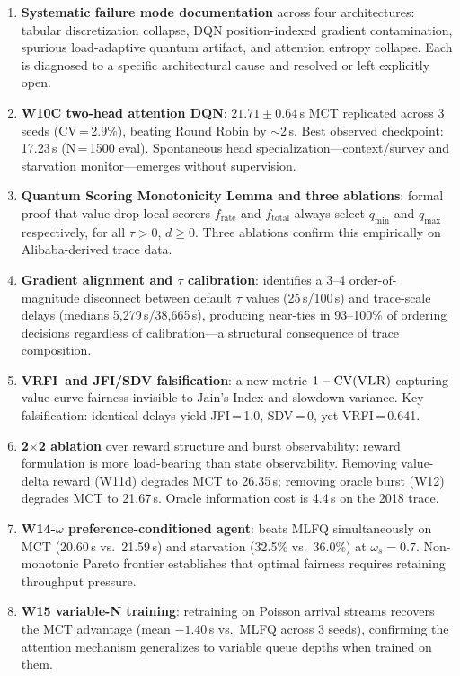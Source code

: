\documentclass[10pt,twocolumn]{article}
\theoremstyle{remark}
\newcommand{\vrfi}{\textsc{VRFI}}
\newcommand{\vlr}{\textsc{VLR}}
\begin{document}
\begin{enumerate}[leftmargin=*, label=\arabic*., itemsep=2pt]

\item \textbf{Systematic failure mode documentation} across four
architectures: tabular discretization collapse, DQN position-indexed
gradient contamination, spurious load-adaptive quantum artifact, and
attention entropy collapse. Each is diagnosed to a specific
architectural cause and resolved or left explicitly open.

\item \textbf{W10C two-head attention DQN}: $21.71\pm0.64$\,s MCT
replicated across 3 seeds (CV\,=\,2.9\%), beating Round Robin by
$\sim$2\,s. Best observed checkpoint: 17.23\,s (N\,=\,1500 eval).
Spontaneous head specialization---context/survey and starvation
monitor---emerges without supervision.

\item \textbf{Quantum Scoring Monotonicity Lemma and three ablations}:
formal proof that value-drop local scorers $f_{\mathrm{rate}}$ and
$f_{\mathrm{total}}$ always select $q_{\min}$ and $q_{\max}$
respectively, for all $\tau>0$, $d\geq0$. Three ablations confirm
this empirically on Alibaba-derived trace data.

\item \textbf{Gradient alignment and $\tau$ calibration}: identifies a
3--4 order-of-magnitude disconnect between default $\tau$ values
(25\,s/100\,s) and trace-scale delays (medians 5,279\,s/38,665\,s),
producing near-ties in 93--100\% of ordering decisions regardless of
calibration---a structural consequence of trace composition.

\item \textbf{\vrfi\ and JFI/SDV falsification}: a new metric
$1 - \mathrm{CV}(\vlr)$ capturing value-curve fairness invisible to
Jain's Index and slowdown variance. Key falsification: identical
delays yield JFI\,=\,1.0, SDV\,=\,0, yet \vrfi\,=\,0.641.

\item \textbf{2$\times$2 ablation} over reward structure and burst
observability: reward formulation is more load-bearing than state
observability. Removing value-delta reward (W11d) degrades MCT to
26.35\,s; removing oracle burst (W12) degrades MCT to 21.67\,s.
Oracle information cost is 4.4\,s on the 2018 trace.

\item \textbf{W14-$\omega$ preference-conditioned agent}: beats MLFQ
simultaneously on MCT (20.60\,s vs.\ 21.59\,s) and starvation
(32.5\% vs.\ 36.0\%) at $\omega_s=0.7$. Non-monotonic Pareto
frontier establishes that optimal fairness requires retaining
throughput pressure.

\item \textbf{W15 variable-N training}: retraining on Poisson arrival
streams recovers the MCT advantage (mean $-1.40$\,s vs.\ MLFQ across
3 seeds), confirming the attention mechanism generalizes to variable
queue depths when trained on them.

\end{enumerate}
\end{document}
